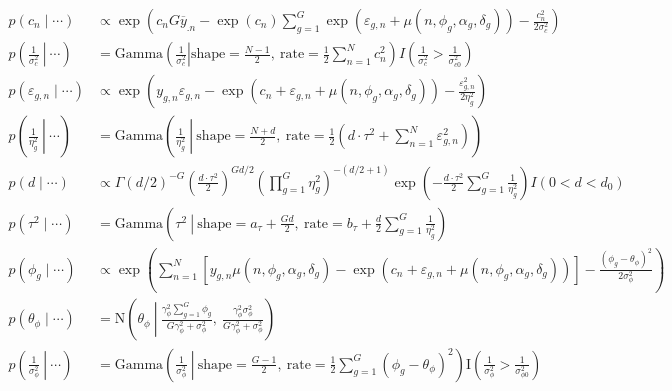 \documentclass{article}\usepackage{graphicx, color}
\providecommand{\e}{\varepsilon}
\providecommand{\ov}[1]{\overline{#1}}
\begin{document}
\begin{flushleft}
\begin{align*}
p(c_n \mid \cdots) &\propto \exp \left (c_n G\ov{y}_{.n}  -\exp(c_n) \sum_{g = 1}^G \exp( \e_{g, n} + \mu(n, \phi_g, \alpha_g, \delta_g)) - \frac{c_n^2}{2 \sigma_c^2} \right ) \\
p \left ( \left . \frac{1}{\sigma_c^2}  \ \right \rvert  \ \cdots \right) &= \text{Gamma} \left ( \left . \frac{1}{\sigma_c^2} \right  |\text{shape} = \frac{N - 1}{2}, \ \text{rate} =\frac{1}{2} {\sum_{n = 1}^N c_n^2} \right )  I \left (\frac{1}{\sigma_c^2} > \frac{1}{\sigma_{c0}^2} \right ) \\
p (\e_{g, n} \mid \cdots) &\propto \exp \left (y_{g, n} \e_{g, n} - \exp(c_n + \e_{g, n} + \mu(n, \phi_g, \alpha_g, \delta_g))  - \frac{\e_{g, n}^2}{2 \eta_g^2} \right) \\
p \left ( \left . \frac{1}{\eta_g^2} \ \right \rvert \  \cdots \right ) &= \text{Gamma} \left ( \left . \frac{1}{\eta_g^2} \ \right \rvert  \ \text{shape} = \frac{N + d}{2}, \  \text{rate} = \frac{1}{2} \left ( d \cdot \tau^2 + \sum_{n  =1}^N \e_{g, n}^2 \right ) \right ) \\
p(d \mid \cdots) &\propto \Gamma \left( d/2 \right )^{-G} \left ( \frac{d \cdot \tau^2}{2}\right ) ^ { G d  /2 } \left ( \prod_{g = 1}^G { \eta_g^2} \right )^{ -(d/2 + 1)} \exp \left (- \frac{d \cdot \tau^2}{2} \sum_{g = 1}^G \frac{1}{ \eta_g^2} \right ) I(0 < d < d_0) \\
p(\tau^2 \mid \cdots) &= \text{Gamma} \left ( \tau^2 \ \left \lvert \ \text{shape} =  a_\tau + \frac{Gd}{2} \right ., \ \text{rate} =  b_\tau + \frac{d}{2} \sum_{g = 1}^G \frac{1}{\eta_g^2} \right ) \\
p(\phi_g \mid \cdots) & \propto \exp \left (\sum_{n = 1}^N \left [y_{g, n} \mu(n, \phi_g, \alpha_g, \delta_g)  - \exp (c_n + \e_{g, n} + \mu(n, \phi_g, \alpha_g, \delta_g)) \right ] - \frac{(\phi_g - \theta_\phi)^2}{2 \sigma_\phi^2} \right ) \\
p(\theta_\phi \mid \cdots) &= \text{N} \left (\theta_\phi \ \left \lvert  \ \frac{ \gamma_\phi^2 \sum_{g = 1}^G \phi_g}{G \gamma_\phi^2 + \sigma_\phi^2} \right ., \ \frac{\gamma_\phi^2 \sigma_\phi^2}{G\gamma_\phi^2 + \sigma_\phi^2} \right ) \\
p \left ( \left . \frac{1}{\sigma_\phi^2}  \ \right \rvert \ \cdots \right ) &= \text{Gamma} \left ( \left . \frac{1}{\sigma_\phi^2} \ \right \rvert \ \text{shape} = \frac{G - 1}{2}, \ \text{rate} =  \frac{1}{2} \sum_{g = 1}^G (\phi_g - \theta_\phi)^2  \right )   \text{I} \left (\frac{1}{\sigma_\phi^2} >\frac{1}{ \sigma_{\phi 0}^2} \right ) \\

\end{align*}
\end{flushleft}
\end{document}
